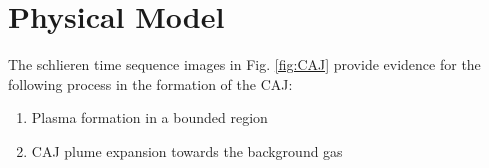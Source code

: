 \documentclass[a4paper]{iacas}%
\begin{document}
%
%
%
%
%

\section{Physical Model}\label{sec:physical_model}
The schlieren time sequence images in Fig. \ref{fig:CAJ} provide evidence for the following process in the formation of the CAJ:
\begin{enumerate}
	\item Plasma formation in a bounded region
	\item CAJ plume expansion towards the background gas
\end{enumerate}
\end{document}
